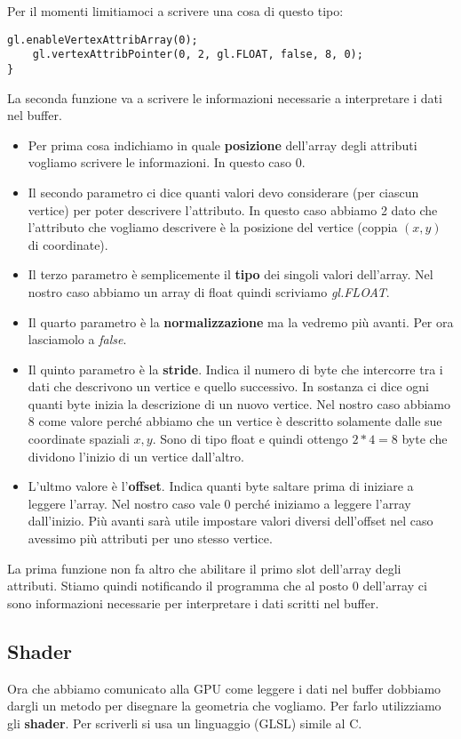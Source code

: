 Per il momenti limitiamoci a scrivere una cosa di questo tipo:
\begin{lstlisting}[style=javascript-style, firstnumber=10]
	gl.enableVertexAttribArray(0);
	gl.vertexAttribPointer(0, 2, gl.FLOAT, false, 8, 0);
}
\end{lstlisting}
La seconda funzione va a scrivere le informazioni necessarie a interpretare i dati nel
buffer.
\begin{itemize}
	\item Per prima cosa indichiamo in quale \textbf{posizione} dell'array degli attributi
	      vogliamo scrivere le informazioni. In questo caso 0.
	\item Il secondo parametro ci dice quanti valori devo considerare (per ciascun vertice)
	      per poter descrivere l'attributo. In questo caso abbiamo 2 dato che l'attributo
	      che vogliamo descrivere \`e la posizione del vertice (coppia $(x, y)$ di
	      coordinate).
	\item Il terzo parametro \`e semplicemente il \textbf{tipo} dei singoli valori dell'array.
	      Nel nostro caso abbiamo un array di float quindi scriviamo \emph{gl.FLOAT}.
	\item Il quarto parametro \`e la \textbf{normalizzazione} ma la vedremo pi\`u avanti.
	      Per ora lasciamolo a \emph{false}.
	\item Il quinto parametro \`e la \textbf{stride}. Indica il numero di byte che intercorre
	      tra i dati che descrivono un vertice e quello successivo. In sostanza ci dice ogni
	      quanti byte inizia la descrizione di un nuovo vertice. Nel nostro caso abbiamo 8
	      come valore perch\'e abbiamo che un vertice \`e descritto solamente dalle sue
	      coordinate spaziali $x, y$. Sono di tipo float e quindi ottengo $2 * 4 = 8$ byte
	      che dividono l'inizio di un vertice dall'altro.
	\item L'ultmo valore \`e l'\textbf{offset}. Indica quanti byte saltare prima di iniziare
	      a leggere l'array. Nel nostro caso vale 0 perch\'e iniziamo a leggere l'array
	      dall'inizio. Pi\`u avanti sar\`a utile impostare valori diversi dell'offset
	      nel caso avessimo pi\`u attributi per uno stesso vertice.
\end{itemize}
La prima funzione non fa altro che abilitare il primo slot dell'array degli attributi.
Stiamo quindi notificando il programma che al posto 0 dell'array ci sono informazioni
necessarie per interpretare i dati scritti nel buffer.

\subsection{Shader}
Ora che abbiamo comunicato alla GPU come leggere i dati nel buffer dobbiamo dargli un
metodo per disegnare la geometria che vogliamo. Per farlo utilizziamo gli \textbf{shader}.
Per scriverli si usa un linguaggio (GLSL) simile al C.

